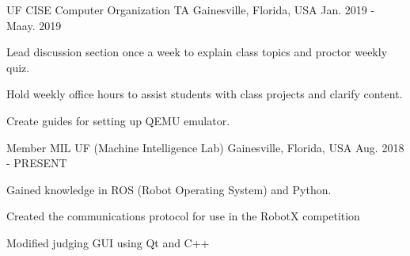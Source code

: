 

\begin{cventries}

  \cventry
    {UF CISE} %
    {Computer Organization TA} %
    {Gainesville, Florida, USA} %
    {Jan. 2019 - Maay. 2019} %
    {
      \begin{cvitems} %
        \item {Lead discussion section once a week to explain class topics and proctor weekly quiz.}
        \item {Hold weekly office hours to assist students with class projects and clarify content.}
        \item {Create guides for setting up QEMU emulator.}
      \end{cvitems}
    }


  \cventry
    {Member} %
    {MIL UF (Machine Intelligence Lab)} %
    {Gainesville, Florida, USA} %
    {Aug. 2018 - PRESENT} %
    {
      \begin{cvitems} %
        \item {Gained knowledge in ROS (Robot Operating System) and Python.}
        \item {Created the communications protocol for use in the RobotX competition}
        \item {Modified judging GUI using Qt and C++}
      \end{cvitems}
    }

\end{cventries}
